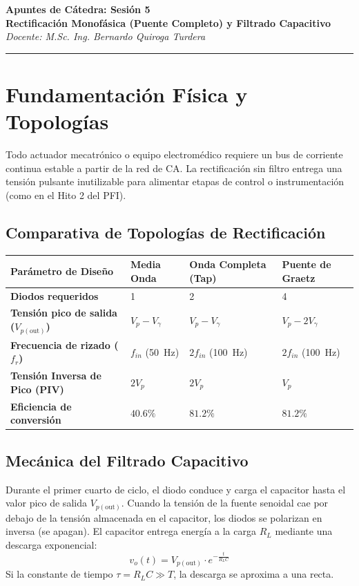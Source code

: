 \documentclass[11pt, a4paper]{article}
\begin{document}
\begin{center}
    {\LARGE \textbf{Apuntes de Cátedra: Sesión 5}}\\[0.3cm]
    {\large \textbf{Rectificación Monofásica (Puente Completo) y Filtrado Capacitivo}}\\
    \textit{Docente: M.Sc. Ing. Bernardo Quiroga Turdera}
    \vspace{0.3cm}
    \hrule
\end{center}

\vspace{0.3cm}

\section{Fundamentación Física y Topologías}
Todo actuador mecatrónico o equipo electromédico requiere un bus de corriente continua estable a partir de la red de CA. La rectificación sin filtro entrega una tensión pulsante inutilizable para alimentar etapas de control o instrumentación (como en el Hito 2 del PFI). 

\subsection{Comparativa de Topologías de Rectificación}
\begin{center}
\renewcommand{\arraystretch}{1.5}
\begin{tabularx}{\textwidth}{@{} >{\bfseries}l X X X @{}}
\toprule
Parámetro de Diseño & Media Onda & Onda Completa (Tap) & Puente de Graetz \\
\midrule
Diodos requeridos & 1 & 2 & 4 \\
Tensión pico de salida ($V_{p(\text{out})}$) & $V_p - V_\gamma$ & $V_p - V_\gamma$ & $V_p - 2V_\gamma$ \\
Frecuencia de rizado ($f_r$) & $f_{in}$ (\qty{50}{\hertz}) & $2f_{in}$ (\qty{100}{\hertz}) & $2f_{in}$ (\qty{100}{\hertz}) \\
Tensión Inversa de Pico (PIV) & $2V_p$ & $2V_p$ & $V_p$ \\
Eficiencia de conversión & $40.6\%$ & $81.2\%$ & $81.2\%$ \\
\bottomrule
\end{tabularx}
\end{center}

\subsection{Mecánica del Filtrado Capacitivo}
Durante el primer cuarto de ciclo, el diodo conduce y carga el capacitor hasta el valor pico de salida $V_{p(\text{out})}$. Cuando la tensión de la fuente senoidal cae por debajo de la tensión almacenada en el capacitor, los diodos se polarizan en inversa (se apagan). El capacitor entrega energía a la carga $R_L$ mediante una descarga exponencial:
\begin{equation}
    v_o(t) = V_{p(\text{out})} \cdot e^{-\frac{t}{R_L C}}
\end{equation}
Si la constante de tiempo $\tau = R_L C \gg T$, la descarga se aproxima a una recta.
\end{document}
